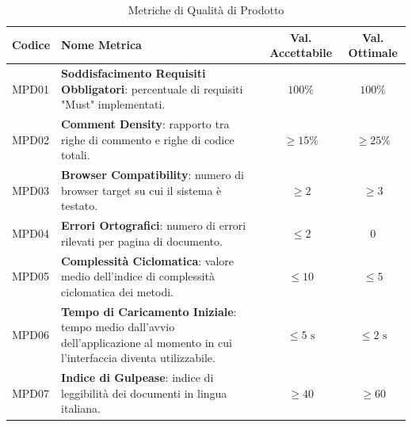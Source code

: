 \begin{table}[H]
    \centering
    \renewcommand{\arraystretch}{1.3}
    \begin{tabularx}{\textwidth}{|l|X|c|c|}
        \hline
        \rowcolor{primarycolor!10}
        \textbf{Codice} & \textbf{Nome Metrica} & \textbf{Val. Accettabile} & \textbf{Val. Ottimale} \\
        \hline
        MPD01 & \textbf{Soddisfacimento Requisiti Obbligatori}: percentuale di requisiti "Must" implementati. & $100\%$ & $100\%$ \\
        \hline
        MPD02 & \textbf{Comment Density}: rapporto tra righe di commento e righe di codice totali. & $\ge 15\%$ & $\ge 25\%$ \\
        \hline
        MPD03 & \textbf{Browser Compatibility}: numero di browser target su cui il sistema è testato. & $\ge 2$ & $\ge 3$ \\
        \hline
        MPD04 & \textbf{Errori Ortografici}: numero di errori rilevati per pagina di documento. & $\le 2$ & $0$ \\
        \hline
        MPD05 & \textbf{Complessità Ciclomatica}: valore medio dell'indice di complessità ciclomatica dei metodi. & $\le 10$ & $\le 5$\\
        \hline
        MPD06 & \textbf{Tempo di Caricamento Iniziale}: tempo medio dall'avvio dell'applicazione al momento in cui l'interfaccia diventa utilizzabile. & $\le 5 \text{ s}$ & $\le 2 \text{ s}$ \\
        \hline
        MPD07 & \textbf{Indice di Gulpease}: indice di leggibilità dei documenti in lingua italiana. & $\ge 40$ & $\ge 60$ \\
        \hline
    \end{tabularx}
    \caption{Metriche di Qualità di Prodotto}
\end{table}

\vspace{0.5cm}
